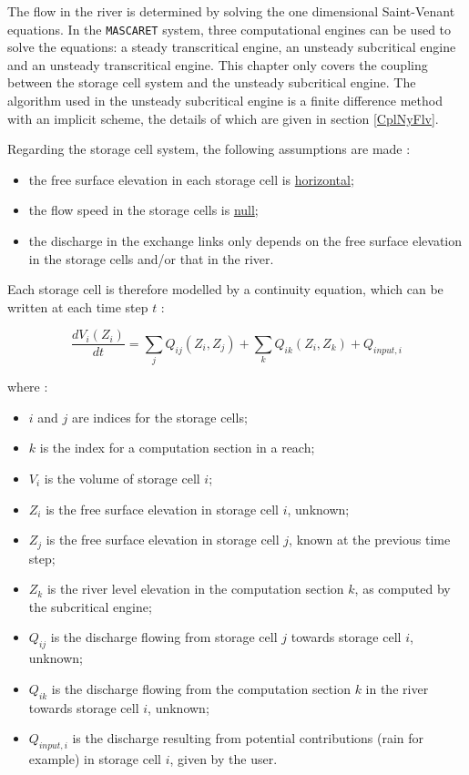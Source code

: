 The flow in the river is determined by solving the one dimensional Saint-Venant equations. In the \texttt{MASCARET} system, three computational engines can be used to solve the equations: a steady transcritical engine, an unsteady subcritical engine and an unsteady transcritical engine. This chapter only covers the coupling between the storage cell system and the unsteady subcritical engine. The algorithm used in the unsteady subcritical engine is a finite difference method with an implicit scheme, the details of which are given in section \ref{CplNyFlv}.

\vspace{0.5cm}

Regarding the storage cell system, the following assumptions are made :
\begin{itemize}
 \item the free surface elevation in each storage cell is \underline{horizontal};
 \item the flow speed in the storage cells is \underline{null};
 \item the discharge in the exchange links only depends on the free surface elevation in the storage cells and/or that in the river.
\end{itemize}

\vspace{0.5cm}

Each storage cell is therefore modelled by a continuity equation, which can be written at each time step $t$ :

\begin{equation}
 \label{EqCas}
 \frac{dV_{i}(Z_i)}{dt} = \sum_j Q_{ij} (Z_i,Z_j) + \sum_k Q_{ik} (Z_i,Z_k) + Q_{input,i}
\end{equation}

where :

\begin{itemize}
 \item $i$ and $j$ are indices for the storage cells;
 \item $k$ is the index for a computation section in a reach;
 \item $V_i$ is the volume of storage cell $i$;
 \item $Z_i$ is the free surface elevation in storage cell $i$, unknown;
 \item $Z_j$ is the free surface elevation in storage cell $j$, known at the previous time step;
 \item $Z_k$ is the river level elevation in the computation section $k$, as computed by the subcritical engine;
 \item $Q_{ij}$ is the discharge flowing from storage cell $j$ towards storage cell $i$, unknown;
 \item $Q_{ik}$ is the discharge flowing from the computation section $k$ in the river towards storage cell $i$, unknown;
 \item $Q_{input,i}$ is the discharge resulting from potential contributions (rain for example) in storage cell $i$, given by the user.
\end{itemize}

